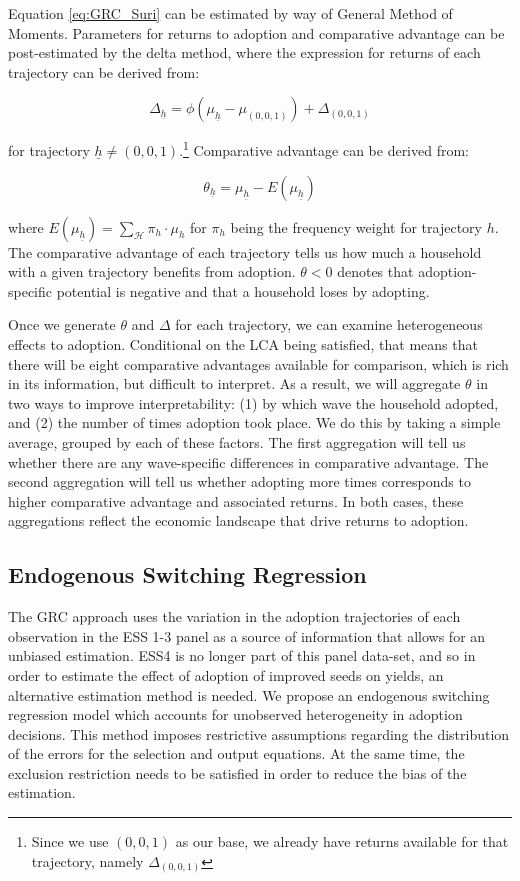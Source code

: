 \documentclass[11pt]{article}
\begin{document}
Equation \ref{eq:GRC_Suri} can be estimated by way of General Method of Moments. Parameters for returns to adoption and comparative advantage can be post-estimated by the delta method, where the expression for returns of each trajectory can be derived from:

$$
\Delta_{\underline{h}}=\phi\left(\mu_{\underline{h}}-\mu_{(0,0,1)}\right) + \Delta_{(0,0,1)}
$$

for trajectory $\underline{h} \neq (0,0,1)$.\footnote{Since we use $(0,0,1)$ as our base, we already have returns available for that trajectory, namely $\Delta_{(0,0,1)}$} Comparative advantage can be derived from:

$$
\theta_{\underline{h}} = \mu_{\underline{h}} - E(\mu_{\underline{h}})
$$

where $E(\mu_{\underline{h}}) = \sum_{\mathcal{H}} \pi_h \cdot \mu_h$ for $\pi_h$ being the frequency weight for trajectory $h$. The comparative advantage of each trajectory tells us how much a household with a given trajectory benefits from adoption. $\theta <0 $ denotes that adoption-specific potential is negative and that a household loses by adopting.

Once we generate $\theta$ and $\Delta$ for each trajectory, we can examine heterogeneous effects to adoption. Conditional on the LCA being satisfied, that means that there will be eight comparative advantages available for comparison, which is rich in its information, but difficult to interpret. As a result, we will aggregate $\theta$ in two ways to improve interpretability: (1) by which wave the household adopted, and (2) the number of times adoption took place. We do this by taking a simple average, grouped by each of these factors. The first aggregation will tell us whether there are any wave-specific differences in comparative advantage. The second aggregation will tell us whether adopting more times corresponds to higher comparative advantage and associated returns. In both cases, these aggregations reflect the economic landscape that drive returns to adoption.

\subsection{Endogenous Switching Regression}

The GRC approach uses the variation in the adoption trajectories of each observation in the ESS 1-3 panel as a source of information that allows for an unbiased estimation. ESS4 is no longer part of this panel data-set, and so in order to estimate the effect of adoption of improved seeds on yields, an alternative estimation method is needed. We propose an endogenous switching regression model which accounts for unobserved heterogeneity in adoption decisions. This method imposes restrictive assumptions regarding the distribution of the errors for the selection and output equations. At the same time, the exclusion restriction needs to be satisfied in order to reduce the bias of the estimation. 
\end{document}
